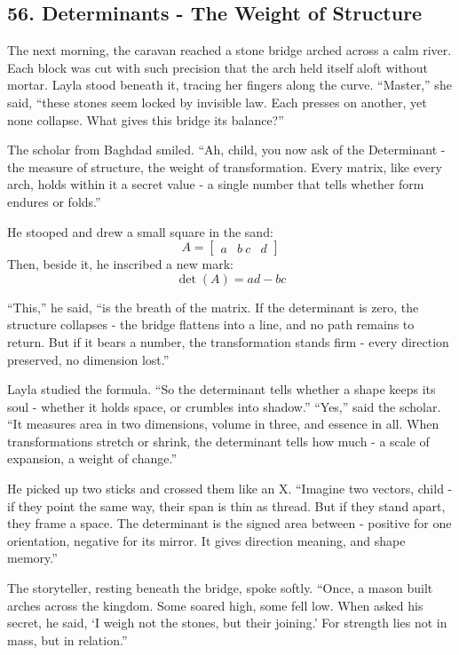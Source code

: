 \documentclass[
  letterpaper,
  DIV=11,
  numbers=noendperiod]{scrreprt}
\begin{document}
\subsection{56. Determinants - The Weight of
Structure}\label{determinants---the-weight-of-structure}

The next morning, the caravan reached a stone bridge arched across a
calm river. Each block was cut with such precision that the arch held
itself aloft without mortar. Layla stood beneath it, tracing her fingers
along the curve. ``Master,'' she said, ``these stones seem locked by
invisible law. Each presses on another, yet none collapse. What gives
this bridge its balance?''

The scholar from Baghdad smiled. ``Ah, child, you now ask of the
Determinant - the measure of structure, the weight of transformation.
Every matrix, like every arch, holds within it a secret value - a single
number that tells whether form endures or folds.''

He stooped and drew a small square in the sand: \[
A =
\begin{bmatrix}
a & b \
c & d
\end{bmatrix}
\] Then, beside it, he inscribed a new mark: \[
\det(A) = ad - bc
\]

``This,'' he said, ``is the breath of the matrix. If the determinant is
zero, the structure collapses - the bridge flattens into a line, and no
path remains to return. But if it bears a number, the transformation
stands firm - every direction preserved, no dimension lost.''

Layla studied the formula. ``So the determinant tells whether a shape
keeps its soul - whether it holds space, or crumbles into shadow.''
``Yes,'' said the scholar. ``It measures area in two dimensions, volume
in three, and essence in all. When transformations stretch or shrink,
the determinant tells how much - a scale of expansion, a weight of
change.''

He picked up two sticks and crossed them like an X. ``Imagine two
vectors, child - if they point the same way, their span is thin as
thread. But if they stand apart, they frame a space. The determinant is
the signed area between - positive for one orientation, negative for its
mirror. It gives direction meaning, and shape memory.''

The storyteller, resting beneath the bridge, spoke softly. ``Once, a
mason built arches across the kingdom. Some soared high, some fell low.
When asked his secret, he said, `I weigh not the stones, but their
joining.' For strength lies not in mass, but in relation.''
\end{document}
